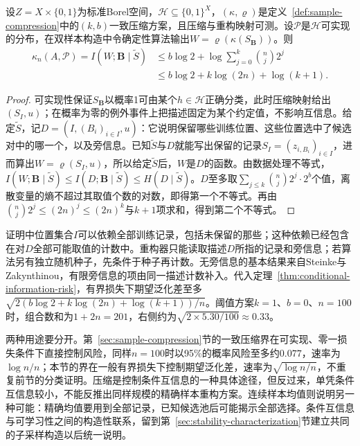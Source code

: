 \begin{theorem}[样本压缩控制条件互信息]
\label{thm:compression-conditional-information}
设$Z=X\times\{0,1\}$为标准Borel空间，$\mathcal H\subseteq\{0,1\}^X$，$(\kappa,\varrho)$是定义~\ref{def:sample-compression}中的$(k,b)$一致压缩方案，且压缩与重构映射可测。设$\mathcal P$是$\mathcal H$可实现的分布，在双样本构造中令确定性算法输出$W=\varrho(\kappa(S_{\bm B}))$。则
\[
\begin{aligned}
 \kappa_n(A,\mathcal P)=I(W;\bm B\mid\tilde S)
 &\leq b\log2+\log\sum_{j=0}^{k}\binom nj2^j\\
 &\leq b\log2+k\log(2n)+\log(k+1).
\end{aligned}
\]
\end{theorem}
\begin{proof}
可实现性保证$S_{\bm B}$以概率1可由某个$h\in\mathcal H$正确分类，此时压缩映射给出$(S_I,u)$；在概率为零的例外事件上把描述固定为某个约定值，不影响互信息。给定$\tilde S$，记$D=(I,(B_i)_{i\in I},u)$：它说明保留哪些训练位置、这些位置选中了候选对中的哪一个，以及旁信息。已知$\tilde S$与$D$就能写出保留的记录$S_I=(z_{i,B_i})_{i\in I}$，进而算出$W=\varrho(S_I,u)$，所以给定$\tilde S$后，$W$是$D$的函数。由数据处理不等式，$I(W;\bm B\mid\tilde S)\leq I(D;\bm B\mid\tilde S)\leq H(D\mid\tilde S)$。$D$至多取$\sum_{j\leq k}\binom nj2^j\cdot2^b$个值，离散变量的熵不超过其取值个数的对数，即得第一个不等式。再由$\binom nj2^j\leq(2n)^j\leq(2n)^k$与$k+1$项求和，得到第二个不等式。
\end{proof}

证明中位置集合$I$可以依赖全部训练记录，包括未保留的那些；这种依赖已经包含在对$D$全部可能取值的计数中。重构器只能读取描述$D$所指的记录和旁信息；若算法另有独立随机种子，先条件于种子再计数。无旁信息的基本结果来自Steinke与Zakynthinou，有限旁信息的项由同一描述计数补入。代入定理~\ref{thm:conditional-information-risk}，有界损失下期望泛化差至多$\sqrt{2(b\log2+k\log(2n)+\log(k+1))/n}$。阈值方案$k=1$、$b=0$、$n=100$时，组合数和为$1+2n=201$，右侧约为$\sqrt{2\times5.30/100}\approx0.33$。

两种用途要分开。第~\ref{sec:sample-compression}节的一致压缩界在可实现、零一损失条件下直接控制风险，同样$n=100$时以95\%的概率风险至多约$0.077$，速率为$\log n/n$；本节的界在一般有界损失下控制期望泛化差，速率为$\sqrt{\log n/n}$，不重复前节的分类证明。压缩是控制条件互信息的一种具体途径，但反过来，单凭条件互信息较小，不能反推出同样规模的精确样本重构方案。连续样本均值则说明另一种可能：精确均值要用到全部记录，已知候选池后可能揭示全部选择。条件互信息与可学习性之间的构造性联系，留到第~\ref{sec:stability-characterization}节建立共同的子采样构造以后统一说明。

